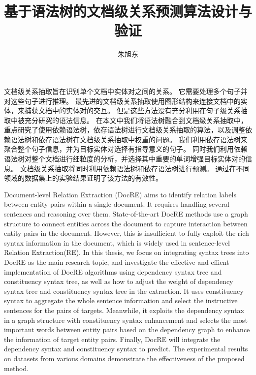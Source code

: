 \documentclass[bachelor]{thesis-uestc}
\title{基于语法树的文档级关系预测算法设计与验证}{Design and Verification of Document-level Relation Extraction Algorithm Based on Syntax Tree}
\author{朱旭东}{Xudong Zhu}
\begin{document}
\makecover

\begin{chineseabstract}
    文档级关系抽取旨在识别单个文档中实体对之间的关系。
    它需要处理多个句子并对这些句子进行推理。
    最先进的文档级关系抽取使用图形结构来连接文档中的实体，来捕获文档中的实体对的交互。
    但是这些方法没有充分利用在句子级关系抽取中被充分研究的语法信息。
    在本文中我们将语法树融合到文档级关系抽取中，重点研究了使用依赖语法树，依存语法树进行文档级关系抽取的算法，以及调整依赖语法树和依存语法树在文档级关系抽取中权重的问题。
    我们利用依存语法树来聚合整个句子信息，并为目标实体对选择有指导意义的句子。
    同时我们利用依赖语法树对整个文档进行细粒度的分析，并选择其中重要的单词增强目标实体对的信息。
    文档级关系抽取将同时利用依赖语法树和依存语法树进行预测。
    通过在不同领域的数据集上的实验结果证明了该方法的有效性。


\end{chineseabstract}

\begin{englishabstract}
    Document-level Relation Extraction (DocRE) aims to identify relation labels between entity pairs within a single document.
    It requires handling several sentences and reasoning over them.
    State-of-the-art DocRE methods use a graph structure to connect entities across the document to capture interaction between entity pairs in the document.
    However, this is insufficient to fully exploit the rich syntax information in the document, which is widely used in sentence-level Relation Extraction(RE).
    In this thesis, we focus on integrating syntax trees into DocRE as the main research topic, and investigate the effective and effient implementation of DocRE algorithms using dependency syntax tree and constituency syntax tree, as well as how to adjust the weight of dependency syntax tree and constituency syntax tree in the extraction.
    It uses constituency syntax to aggregate the whole sentence information and select the instructive sentences for the pairs of targets.
    Meanwhile, it exploits the dependency syntax in a graph structure with constituency syntax enhancement and selects the most important words between entity pairs based on the dependency graph to enhance the information of target entity pairs.
    Finally, DocRE will integrate the dependency syntax and constituency syntax to predict.
    The experimental results on datasets from various domains demonstrate the effectiveness of the proposed method.


\end{englishabstract}
\end{document}
